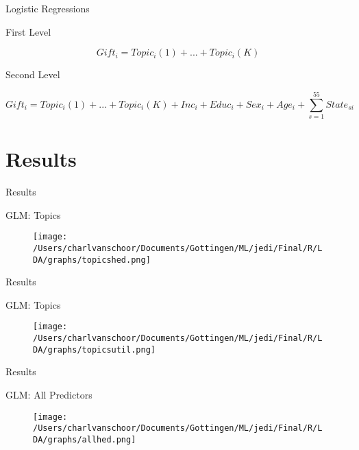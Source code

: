 \documentclass{beamer}
\begin{document}
\begin{frame}{Logistic Regressions}
\begin{block}{First Level}

\[Gift{_i} = Topic{_i}(1) + ... + Topic{_i}(K)\]
\end{block}

\begin{block}{Second Level}

\[Gift{_i} = Topic{_i}(1) + ... + Topic{_i}(K) + Inc{_i} + Educ{_i} + Sex{_i} + Age{_i} + \sum\limits_{s = 1}^{55} {State{_{si}}} \]
\end{block}
\end{frame}













\section{Results} 
\begin{frame}{Results}

\begin{block}{GLM: Topics}
\begin{figure}
\texttt{[image: /Users/charlvanschoor/Documents/Gottingen/ML/jedi/Final/R/LDA/graphs/topicshed.png]}
\end{figure}
\end{block}

\end{frame}


\begin{frame}{Results}

\begin{block}{GLM: Topics}
\begin{figure}
\texttt{[image: /Users/charlvanschoor/Documents/Gottingen/ML/jedi/Final/R/LDA/graphs/topicsutil.png]}
\end{figure}
\end{block}

\end{frame}


\begin{frame}{Results}

\begin{block}{GLM: All Predictors}
\begin{figure}
\texttt{[image: /Users/charlvanschoor/Documents/Gottingen/ML/jedi/Final/R/LDA/graphs/allhed.png]}
\end{figure}
\end{block}

\end{frame}
\end{document}
